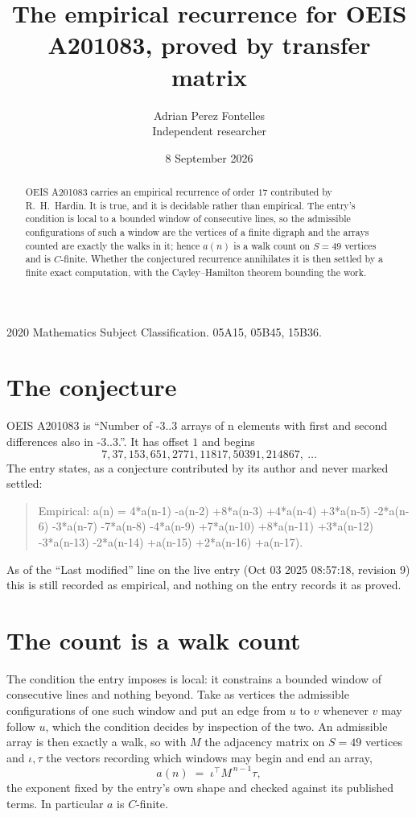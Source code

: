 \documentclass[11pt,a4paper]{article}
\title{The empirical recurrence for OEIS A201083, proved by transfer matrix}
\author{Adrian Perez Fontelles\\ \small Independent researcher}
\date{8 September 2026}
\theoremstyle{plain}
\theoremstyle{definition}
\begin{document}
\maketitle

\begin{abstract}
OEIS A201083 carries an empirical recurrence of order $17$ contributed by R.~H.~Hardin. It is
true, and it is decidable rather than empirical. The entry's condition is local to a bounded window of consecutive lines, so
the admissible configurations of such a window are the vertices of a finite digraph and the
arrays counted are exactly the walks in it; hence $a(n)$ is a walk count on $S=49$ vertices
and is $C$-finite. Whether the conjectured recurrence annihilates it is then settled by a
finite exact computation, with the Cayley--Hamilton theorem bounding the work.
\end{abstract}

\noindent\small 2020 Mathematics Subject Classification. 05A15, 05B45, 15B36.\normalsize

\section{The conjecture}

OEIS A201083 is ``Number of -3..3 arrays of n elements with first and second differences also in -3..3.''. It has offset $1$ and begins
\[
7, 37, 153, 651, 2771, 11817, 50391, 214867,\ \dots
\]
The entry states, as a conjecture contributed by its author and never marked settled:
\begin{quote}
Empirical: a(n) = 4*a(n-1) -a(n-2) +8*a(n-3) +4*a(n-4) +3*a(n-5) -2*a(n-6) -3*a(n-7) -7*a(n-8) -4*a(n-9) +7*a(n-10) +8*a(n-11) +3*a(n-12) -3*a(n-13) -2*a(n-14) +a(n-15) +2*a(n-16) +a(n-17).
\end{quote}
As of the ``Last modified'' line on the live entry (Oct 03 2025 08:57:18, revision 9) this is still
recorded as empirical, and nothing on the entry records it as proved.

\section{The count is a walk count}

The condition the entry imposes is local: it constrains a bounded window of consecutive lines and nothing beyond. Take as
vertices the admissible configurations of one such window and put an edge from $u$ to $v$
whenever $v$ may follow $u$, which the condition decides by inspection of the two. An
admissible array is then exactly a walk, so with $M$ the adjacency matrix on $S=49$ vertices
and $\iota,\tau$ the vectors recording which windows may begin and end an array,
\[
a(n)\;=\;\iota^{\!\top}M^{\,n-1}\tau ,
\]
the exponent fixed by the entry's own shape and checked against its published terms. In
particular $a$ is $C$-finite.
\end{document}
